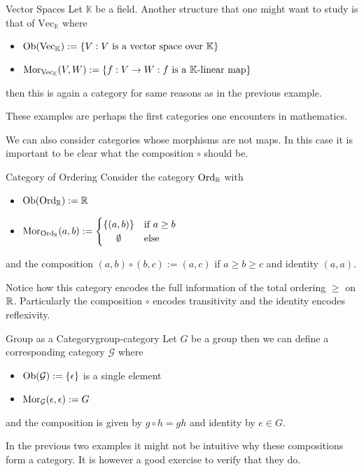 \begin{example}{Vector Spaces}{}
Let $\mathbb{K}$ be a field. Another structure that one might want to study is that of $\mathrm{Vec}_\mathbb{K}$ where
\begin{itemize}
    \item $\mathrm {Ob}(\mathrm{Vec}_\mathbb{K}) := \{V : \text{$V$ is a vector space over $\mathbb{K}$}\}$
    \item $\mathrm {Mor}_{\mathrm{Vec}_\mathbb{K}}(V,W) := \{f: V \to W : \text{$f$ is a $\mathbb{K}$-linear map}\}$
\end{itemize}
then this is again a category for same reasons as in the previous example.
\end{example}
These examples are perhaps the first categories one encounters in mathematics. 

We can also consider categories whose morphisms are not maps. In this case it is important to be clear what the composition $\circ$ should be.

\begin{example}{Category of Ordering}{}
Consider the category $\mathrm{Ord}_\mathbb R$ with
\begin{itemize}
    \item $\mathrm {Ob}(\mathrm{Ord}_\mathbb R) := \mathbb R$
    \item $\mor_{\mathrm{Ord}_\R}(a,b) := \begin{cases}
        \{(a,b)\} & \text{if $a \ge b$} \\
        \hfil \emptyset & \text{else}
    \end{cases}$
\end{itemize}
and the composition $(a,b) \circ (b,c) := (a,c)$ if $a \ge b \ge c$ and identity $(a,a)$.

Notice how this category encodes the full information of the total ordering $\ge$ on $\mathbb R$. Particularly the composition $\circ$ encodes transitivity and the identity encodes reflexivity.
\end{example}

\begin{example}{Group as a Category}{group-category}
Let $G$ be a group then we can define a corresponding category $\mathcal{G}$ where
\begin{itemize}
    \item $\mathrm {Ob}(\mathcal{G}) := \{\epsilon\}$ is a single element
    \item $\mathrm {Mor}_{\mathcal{G}}(\epsilon,\epsilon) := G$
\end{itemize}
and the composition is given by $g \circ h = gh$ and identity by $e \in G$.
\end{example}
In the previous two examples it might not be intuitive why these compositions form a category. It is however a good exercise to verify that they do.

